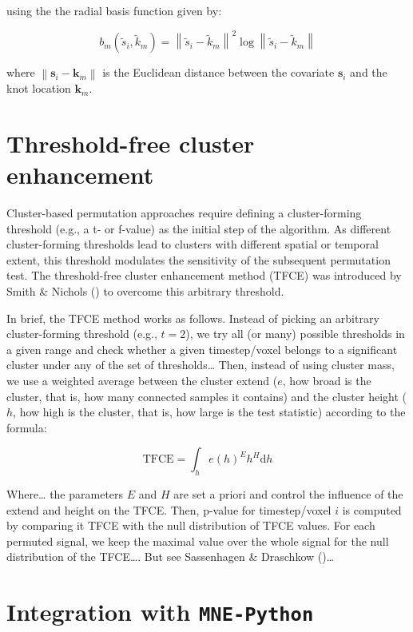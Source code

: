 \documentclass[
  doc,
  floatsintext,
  longtable,
  a4paper,
  nolmodern,
  notxfonts,
  notimes,
  colorlinks=true,linkcolor=blue,citecolor=blue,urlcolor=blue]{apa7}
\begin{document}
using the the radial basis function given by:

\[
b_m\left(\tilde{s}_i, \tilde{k}_m\right)=\left\|\tilde{s}_i-\tilde{k}_m\right\|^2 \log \left\|\tilde{s}_i-\tilde{k}_m\right\|
\]

where \(\left\|\mathbf{s}_i-\mathbf{k}_{m}\right\|\) is the Euclidean
distance between the covariate \(\mathbf{s}_{i}\) and the knot location
\(\mathbf{k}_{m}\).

\newpage

\section{Threshold-free cluster
enhancement}\label{threshold-free-cluster-enhancement}

Cluster-based permutation approaches require defining a cluster-forming
threshold (e.g., a t- or f-value) as the initial step of the algorithm.
As different cluster-forming thresholds lead to clusters with different
spatial or temporal extent, this threshold modulates the sensitivity of
the subsequent permutation test. The threshold-free cluster enhancement
method (TFCE) was introduced by Smith \& Nichols
() to overcome this arbitrary threshold.

In brief, the TFCE method works as follows. Instead of picking an
arbitrary cluster-forming threshold (e.g., \(t=2\)), we try all (or
many) possible thresholds in a given range and check whether a given
timestep/voxel belongs to a significant cluster under any of the set of
thresholds\ldots{} Then, instead of using cluster mass, we use a
weighted average between the cluster extend (\(e\), how broad is the
cluster, that is, how many connected samples it contains) and the
cluster height (\(h\), how high is the cluster, that is, how large is
the test statistic) according to the formula:

\[
\text{TFCE} = \int_{h} e(h)^{E} h^{H} \mathrm{d}h
\]

Where\ldots{} the parameters \(E\) and \(H\) are set a priori and
control the influence of the extend and height on the TFCE. Then,
p-value for timestep/voxel \(i\) is computed by comparing it TFCE with
the null distribution of TFCE values. For each permuted signal, we keep
the maximal value over the whole signal for the null distribution of the
TFCE\ldots. But see Sassenhagen \& Draschkow
()\ldots{}

\newpage

\section{\texorpdfstring{Integration with
\texttt{MNE-Python}}{Integration with MNE-Python}}\label{integration-with-mne-python}
\end{document}

